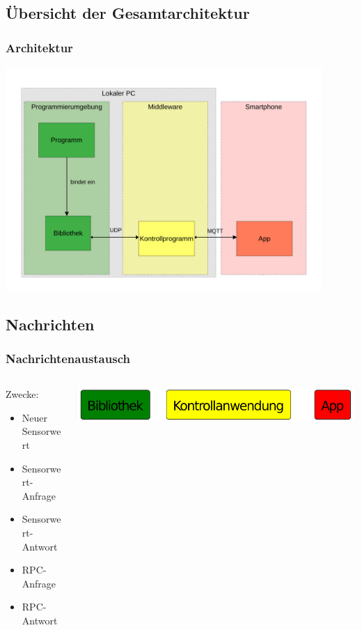 \documentclass{beamer}
\begin{document}
\subsection*{Übersicht der Gesamtarchitektur}
\begin{frame}
    \frametitle[]{Architektur}
    \centering
    \includegraphics[width=0.9\textwidth]{images/framework.pdf}
\end{frame}

\subsection*{Nachrichten}
\begin{frame}
    \frametitle[]{Nachrichtenaustausch}
    \begin{columns}
        \begin{column}{0.3\textwidth}
        Zwecke:
            \begin{itemize}
                \item Neuer Sensorwert
                \item Sensorwert-Anfrage
                \item Sensorwert-Antwort
                \item RPC-Anfrage
                \item RPC-Antwort
            \end{itemize}
        \end{column}
        \begin{column}{0.6\textwidth}
            \centering
            \includegraphics[width=\textwidth]{images/parts.png}
        \end{column}
    \end{columns}
\end{frame}
\end{document}
